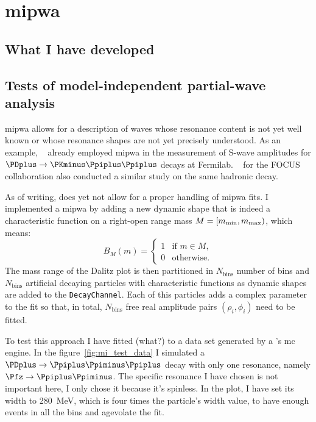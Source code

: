 \chapter{\acl{mipwa}}
\label{chap:model_independent_pwa}

    \section{What I have developed}

    \section{Tests of model-independent partial-wave analysis}
    \ac{mipwa} allows for a description of waves whose resonance content is not yet well known or whose resonance shapes are not yet precisely understood.
    As an example, \citeauthor{PhysRevD.73.032004}~\cite{PhysRevD.73.032004} already employed \ac{mipwa} in the measurement of S-wave amplitudes for $\PDplus\to\PKminus\Ppiplus\Ppiplus$ decays at Fermilab.
    \citeauthor{Link200914}~\cite{Link200914} for the {\small FOCUS} collaboration also conducted a similar study on the same hadronic decay.


    As of writing,  does yet not allow for a proper handling of \ac{mipwa} fits.
    I implemented a \ac{mipwa} by adding a new dynamic shape that is indeed a characteristic function on a right-open range mass $M = [m_\textup{min}, m_\textup{max})$, which means:
    \begin{equation}
        B_M(m) = 
        \begin{cases}
            1 &\text{if }m\in M, \\
            0 &\text{otherwise}.
        \end{cases}
    \end{equation}
    The mass range of the Dalitz plot is then partitioned in $N_\text{bins}$ number of bins and $N_\text{bins}$ artificial decaying particles with characteristic functions as dynamic shapes are added to the \lstinline!DecayChannel!.
    Each of this particles adds a complex parameter to the fit so that, in total, $N_\text{bins}$ free real amplitude pairs $(\rho_i,\phi_i)$ need to be fitted.


    To test this approach I have fitted (what?) to a data set generated by a 's \ac{mc} engine.
    In the figure~\ref{fig:mi_test_data} I simulated a $\PDplus\to\Ppiplus\Ppiminus\Ppiplus$ decay with only one resonance, namely $\Pfz\to\Ppiplus\Ppiminus$.
    The specific resonance I have chosen is not important here, I only chose it because it's spinless.
    In the plot, I have set its width to \SI{280}{\mega\electronvolt}, which is four times the particle's width value, to have enough events in all the bins and agevolate the fit.



